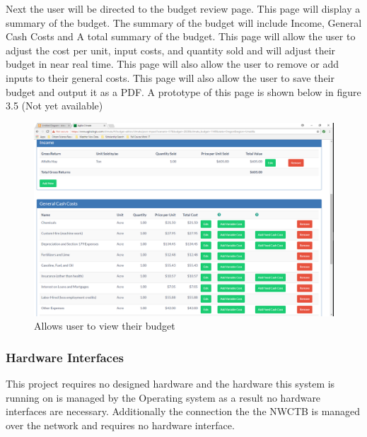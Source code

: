\documentclass[onecolumn, draftclsnofoot,10pt, compsoc]{article}
\begin{document}
					Next the user will be directed to the budget review page. This page will display a summary of the budget. The summary of the budget will include Income, General Cash Costs and A total summary of the budget. This page will allow the user to adjust the cost per unit, input costs, and quantity sold and will adjust their budget in near real time. This page will also allow the user to remove or add inputs to their general costs. This page will also allow the user to save their budget and output it as a PDF. A prototype of this page is shown below in figure 3.5 (Not yet available)\\
					
					\begin{figure}
						\includegraphics[width=\linewidth]{Figures/BudgetReview.PNG}
						\caption{Allows user to view their budget}
						\label{figure3.5}
					\end{figure}

        \subsubsection{Hardware Interfaces}
					This project requires no designed hardware and the hardware this system is running on is managed by the Operating system as a result no hardware interfaces are necessary. Additionally the connection the the NWCTB is managed over the network and requires no hardware interface.\\
\end{document}
